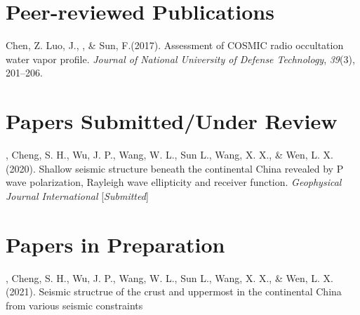 \newcommand{\Revision}{\textit{under revision}}
\newcommand{\CS}{*} %
\newcommand{\CF}{\textsuperscript{\#}} %


\section*{Peer-reviewed Publications}

\begin{etaremune}
\item
    Chen, Z. Luo, J.,  \Xiao, \& Sun, F.(2017).
    Assessment of COSMIC radio occultation water vapor profile.
    \textit{Journal of National University of Defense Technology}, \textit{39}(3), 201--206.
\end{etaremune}

\section*{Papers Submitted/Under Review}
\begin{etaremune}
\item
    \Xiao, Cheng, S. H., Wu, J. P., Wang, W. L., Sun L., Wang, X. X., \& Wen, L. X. (2020).
    Shallow seismic structure beneath the continental China revealed by P wave polarization, Rayleigh wave ellipticity and receiver function.
    \textit{Geophysical Journal International} [\textit{Submitted}]
\end{etaremune}

\section*{Papers in Preparation}
\begin{etaremune}
\item
    \Xiao, Cheng, S. H., Wu, J. P., Wang, W. L., Sun L., Wang, X. X., \& Wen, L. X. (2021).
    Seismic structrue of the crust and uppermost in the continental China from various seismic constraints
\end{etaremune}

